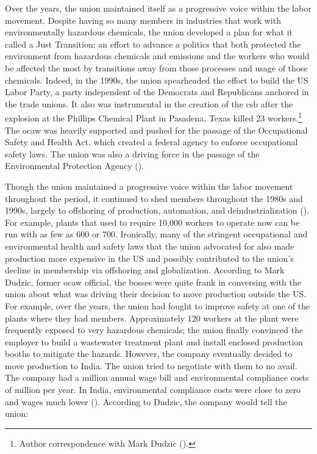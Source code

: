 \documentclass[12pt]{article}
\begin{document}
Over the years, the union maintained itself as a progressive voice within the labor movement. Despite having so many members in industries that work with environmentally hazardous chemicals, the union developed a plan for what it called a Just Transition: an effort to advance a politics that both protected the environment from hazardous chemicals and emissions and the workers who would be affected the most by transitions away from those processes and usage of those chemicals. Indeed, in the 1990s, the union spearheaded the effort to build the US Labor Party, a party independent of the Democrats and Republicans anchored in the trade unions. It also was instrumental in the creation of the \acrfull{csb} after the explosion at the Phillips Chemical Plant in Pasadena, Texas killed 23 workers.\footnote{Author correspondence with Mark Dudzic (\citeyear{dudzicInterview2024}).} The \acrshort{ocaw} was heavily supported and pushed for the passage of the Occupational Safety and Health Act, which created a federal agency to enforce occupational safety laws. The union was also a driving force in the passage of the Environmental Protection Agency (\cite{leopoldManWhoHated2007}).

Though the union maintained a progressive voice within the labor movement throughout the period, it continued to shed members throughout the 1980s and 1990s, largely to offshoring of production, automation, and deindustrialization (\cite{dudzicInterview2024}). For example, plants that used to require 10,000 workers to operate now can be run with as few as 600 or 700. Ironically, many of the stringent occupational and environmental health and safety laws that the union advocated for also made production more expensive in the US and possibly contributed to the union’s decline in membership via offshoring and globalization. According to Mark Dudzic, former \acrshort{ocaw} official, the bosses were quite frank in conversing with the union about what was driving their decision to move production outside the US. For example, over the years, the union had fought to improve safety at one of the plants where they had members. Approximately 120 workers at the plant were frequently exposed to very hazardous chemicals; the union finally convinced the employer to build a wastewater treatment plant and install enclosed production booths to mitigate the hazards. However, the company eventually decided to move production to India. The union tried to negotiate with them to no avail. The company had a   million annual wage bill and environmental compliance costs of   million per year. In India, environmental compliance costs were close to zero and wages much lower (\cite{dudzicInterview2024}). According to Dudzic, the company would tell the union:
\end{document}
